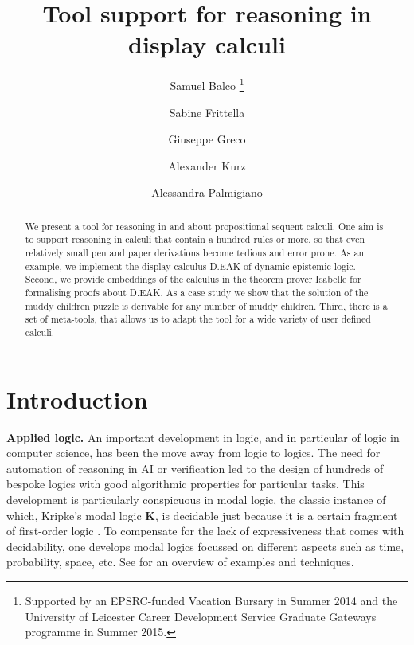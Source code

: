 \documentclass[runningheads,a4paper]{llncs}
\begin{document}
\mainmatter

\title{Tool support for reasoning in display calculi}


\author{Samuel Balco \thanks{Supported by an EPSRC-funded Vacation Bursary in Summer 2014 and the University of Leicester Career Development Service Graduate Gateways programme in Summer 2015.} 
\and 
Sabine Frittella  
\and 
Giuseppe Greco 
\and 
Alexander Kurz 
\and 
Alessandra Palmigiano}



\maketitle

\begin{abstract} 
We present a tool for reasoning in and about propositional sequent calculi. One aim is to support reasoning in calculi that contain a hundred rules or more, so that even relatively small pen and paper derivations become tedious and error prone. As an example, we implement the display calculus D.EAK of  dynamic epistemic logic. Second, we provide embeddings of  the calculus in the theorem prover Isabelle for formalising proofs about D.EAK. As a case study we show that the solution of the muddy children puzzle is derivable for any number of muddy children. Third, there is a set of meta-tools, that allows us to adapt the tool for a wide variety of user defined calculi.
\end{abstract}



\section{Introduction}

\medskip\noindent\textbf{Applied logic. }
An important development in logic, and in particular of logic in computer science, has been the move away from logic to logics. The need for automation of reasoning in AI or verification led to the design of hundreds of bespoke logics with good algorithmic properties for particular tasks. This development is particularly conspicuous in modal logic, the classic instance of which, Kripke's modal logic \textbf{K}, is decidable just because it is a certain fragment of first-order logic \cite{mlhandbook:BB}. To compensate for the lack of expressiveness that comes with decidability, one develops modal logics focussed on different aspects such as time, probability, space, etc. See \cite{mlhandbook} for an overview of examples and techniques.
\end{document}
